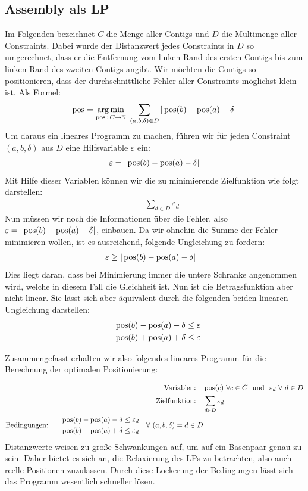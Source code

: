 \subsection{Assembly als LP}
Im Folgenden bezeichnet $C$ die Menge aller Contigs und $D$ die Multimenge aller Constraints. Dabei wurde der Distanzwert jedes Constraints in $D$ so umgerechnet, dass er die Entfernung 
vom linken Rand 
des ersten Contigs bis zum linken Rand des zweiten Contigs angibt.
Wir möchten die Contigs so positionieren, dass der durchschnittliche Fehler aller Constraints 
möglichst klein ist. Als Formel:
\[ \operatorname*{pos} = \operatorname*{arg\,min}_{\operatorname*{pos}\,:\, C \rightarrow \mathbb{N}} \ \sum_{(a,b,\delta) \in D} |\operatorname*{pos}(b) - \operatorname*{pos}(a) - \delta| \] 
Um daraus ein lineares Programm zu machen, führen wir für jeden Constraint $(a,b,\delta)$ aus $D$ eine Hilfsvariable $\varepsilon$ ein:
\[ \varepsilon = |\operatorname*{pos}(b) - \operatorname*{pos}(a) - \delta| \]
Mit Hilfe dieser Variablen können wir die zu minimierende Zielfunktion wie folgt darstellen:
\begin{align*}
\quad& \sum_{d \in D} \varepsilon_{d}
\end{align*}
Nun müssen wir noch die Informationen über die Fehler, also $\varepsilon = |\operatorname*{pos}(b) - \operatorname*{pos}(a) - \delta|$, einbauen. Da wir ohnehin die Summe der Fehler minimieren wollen, ist es ausreichend, folgende Ungleichung zu fordern:
\begin{align*}
\varepsilon \geq |\operatorname*{pos}(b) &- \operatorname*{pos}(a) - \delta|
\end{align*}
Dies liegt daran, dass bei Minimierung immer die untere Schranke angenommen wird, welche in diesem Fall die Gleichheit ist. Nun ist die Betragsfunktion aber nicht linear. Sie lässt sich aber äquivalent durch die folgenden beiden linearen Ungleichung darstellen:
\begin{align*}
\operatorname*{pos}(b) - \operatorname*{pos}(a) - \delta &\leq \varepsilon\\
-\operatorname*{pos}(b) + \operatorname*{pos}(a) + \delta &\leq \varepsilon
\end{align*}

Zusammengefasst erhalten wir also folgendes lineares Programm für die Berechnung der optimalen Positionierung:

\begin{align*}
\text{Variablen:}\quad& \pos(c) \ \forall c \in C \ \ \text{und} \ \ \varepsilon_{d} \ \forall \ d \in D\\
\text{Zielfunktion:}\quad& \sum_{d \in D} \varepsilon_{d}\\
\text{Bedingungen:}\quad \begin{split} \pos(b) - \pos(a) - \delta \leq \varepsilon_{d}\\
-\pos(b) + \pos(a) + \delta \leq \varepsilon_{d} \end{split}\quad \forall \ (a,b,\delta) = d \in D
\end{align*}
Distanzwerte weisen zu große Schwankungen auf, um auf ein Basenpaar genau zu sein. Daher bietet es sich an, die Relaxierung des LPs zu betrachten, also auch reelle Positionen zuzulassen. Durch diese Lockerung der Bedingungen lässt sich das Programm wesentlich schneller lösen.

